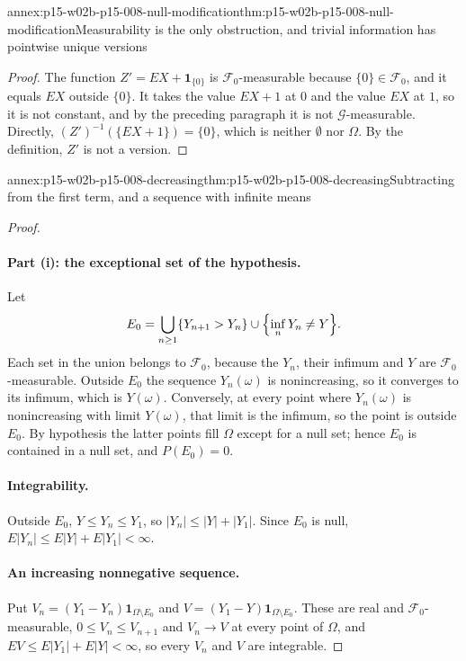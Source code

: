 \begin{annexitem}{annex:p15-w02b-p15-008-null-modification}{thm:p15-w02b-p15-008-null-modification}{Measurability is the only obstruction, and trivial information has pointwise unique versions}
\begin{proof}
The function \(Z'=EX+\mathbf1_{\{0\}}\) is \(\mathcal F_0\)-measurable
because \(\{0\}\in\mathcal F_0\), and it equals \(EX\) outside \(\{0\}\).
It takes the value \(EX+1\) at \(0\) and the value \(EX\) at \(1\), so it
is not constant, and by the preceding paragraph it is not
\(\mathcal G\)-measurable. Directly,
\((Z')^{-1}(\{EX+1\})=\{0\}\), which is neither \(\emptyset\) nor
\(\Omega\). By the definition, \(Z'\) is not a version.
\end{proof}
\end{annexitem}

\begin{annexitem}{annex:p15-w02b-p15-008-decreasing}{thm:p15-w02b-p15-008-decreasing}{Subtracting from the first term, and a sequence with infinite means}
\begin{proof}
\paragraph{Part (i): the exceptional set of the hypothesis.}
Let
\[
 E_0=\bigcup_{n\geq1}\{Y_{n+1}>Y_n\}
     \cup\Bigl\{\inf_{n}Y_n\neq Y\Bigr\}.
\]
Each set in the union belongs to \(\mathcal F_0\), because the \(Y_n\),
their infimum and \(Y\) are \(\mathcal F_0\)-measurable. Outside \(E_0\)
the sequence \(Y_n(\omega)\) is nonincreasing, so it converges to its
infimum, which is \(Y(\omega)\). Conversely, at every point where
\(Y_n(\omega)\) is nonincreasing with limit \(Y(\omega)\), that limit is
the infimum, so the point is outside \(E_0\). By hypothesis the latter
points fill \(\Omega\) except for a null set; hence \(E_0\) is contained in
a null set, and \(P(E_0)=0\).

\paragraph{Integrability.}
Outside \(E_0\), \(Y\leq Y_n\leq Y_1\), so \(|Y_n|\leq|Y|+|Y_1|\). Since
\(E_0\) is null, \(E|Y_n|\leq E|Y|+E|Y_1|<\infty\).

\paragraph{An increasing nonnegative sequence.}
Put \(V_n=(Y_1-Y_n)\mathbf1_{\Omega\setminus E_0}\) and
\(V=(Y_1-Y)\mathbf1_{\Omega\setminus E_0}\). These are real and
\(\mathcal F_0\)-measurable, \(0\leq V_n\leq V_{n+1}\) and
\(V_n\to V\) at every point of \(\Omega\), and
\(EV\leq E|Y_1|+E|Y|<\infty\), so every \(V_n\) and \(V\) are integrable.


\end{proof}
\end{annexitem}

